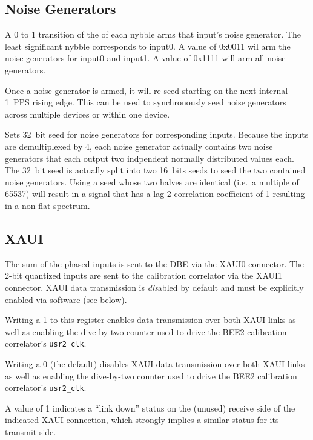 \documentclass[12pt]{article}
\begin{document}
  \subsection{Noise Generators}

\begin{description}

  A 0 to 1 transition of the \LSb of each
nybble arms that input's noise generator.  The least significant nybble
corresponds to input0.  A value of 0x0011 wil arm the noise generators for
input0 and input1.  A value of 0x1111 will arm all noise generators.

Once a noise generator is armed, it will re-seed starting on the next internal
1~PPS rising edge.  This can be used to synchronously seed noise generators
across multiple devices or within one device.

\filbreak
{}
 Sets 32~bit seed for noise generators for corresponding
inputs.  Because the inputs are demultiplexed by 4, each noise generator
actually contains two noise generators that each output two indpendent normally
distributed values each.  The 32~bit seed is actually split into two 16~bits
seeds to seed the two contained noise generators.  Using a seed whose two
halves are identical (i.e.\ a multiple of 65537) will result in a signal that
has a lag-2 correlation coefficient of 1 resulting in a non-flat spectrum.

\end{description}

  \subsection{XAUI}
The sum of the phased inputs is sent to the DBE via the XAUI0 connector.  The
2-bit quantized inputs are sent to the calibration correlator via the XAUI1
connector.  XAUI data transmission is \emph{dis}abled by default and must be
explicitly enabled via software (see below).

\begin{description}

 Writing a 1 to this register enables data transmission over
both XAUI links as well as enabling the dive-by-two counter used to drive the
BEE2 calibration correlator's \verb|usr2_clk|.

Writing a 0 (the default) disables XAUI data transmission over both XAUI links
as well as enabling the dive-by-two counter used to drive the BEE2 calibration
correlator's \verb|usr2_clk|.

\filbreak
{}
 A value of 1 indicates a ``link down'' status on
the (unused) receive side of the indicated XAUI connection, which strongly
implies a similar status for its transmit side.

\end{description}
\end{document}
